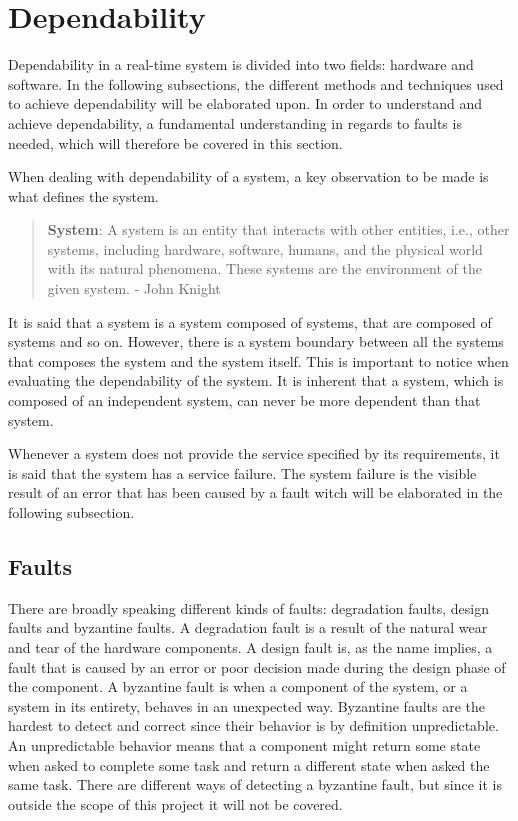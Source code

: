 \section{Dependability}
Dependability in a real-time system is divided into two fields: hardware and software. 
In the following subsections, the different methods and techniques used to achieve dependability will be elaborated upon.  
In order to understand and achieve dependability, a fundamental understanding in regards to faults is needed, which will therefore be covered in this section.

When dealing with dependability of a system, a key observation to be made is what defines the system. 
\begin{quote}
\textbf{System}: A system is an entity that interacts with other entities, i.e., other systems, including hardware, software, humans, and the physical world with its natural phenomena.
These systems are the environment of the given system. 
- John Knight \cite{FundementalsOfDependableComputingForSoftwareEngineers}
\end{quote}
It is said that a system is a system composed of systems, that are composed of systems and so on. 
However, there is a system boundary between all the systems that composes the system and the system itself. 
This is important to notice when evaluating the dependability of the system. 
It is inherent that a system, which is composed of an independent system, can never be more dependent than that system. 

Whenever a system does not provide the service specified by its requirements, it is said that the system has a service failure. 
The system failure is the visible result of an error that has been caused by a fault witch will be elaborated in the following subsection.

\subsection{Faults}
There are broadly speaking different kinds of faults: degradation faults, design faults and byzantine faults. 
A degradation fault is a result of the natural wear and tear of the hardware components.
A design fault is, as the name implies, a fault that is caused by an error or poor decision made during the design phase of the component. 
A byzantine fault is when a component of the system, or a system in its entirety, behaves in an unexpected way. 
Byzantine faults are the hardest to detect and correct since their behavior is by definition unpredictable. 
An unpredictable behavior means that a component might return some state when asked to complete some task and return a different state when asked the same task. 
There are different ways of detecting a byzantine fault, but since it is outside the scope of this project it will not be covered. 

